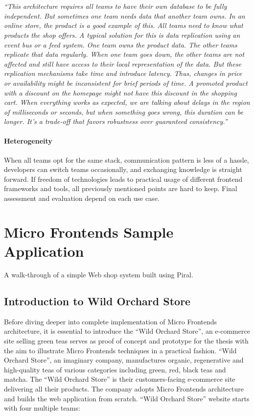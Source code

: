 \documentclass[a4paper]{book}
\begin{document}
\\ \\ 
\textit{
“This architecture requires all teams to have their own database to be fully independent. But sometimes one team needs data that another team owns. In an online store, the product is a good example of this. All teams need to know what products the shop offers. A typical solution for this is data replication using an event bus or a feed system. One team owns the product data. The other teams replicate that data regularly. When one team goes down, the other teams are not affected and still have access to their local representation of the data. But these replication mechanisms take time and introduce latency. Thus, changes in price or availability might be inconsistent for brief periods of time. A promoted product with a discount on the homepage might not have this discount in the shopping cart. When everything works as expected, we are talking about delays in the region of milliseconds or seconds, but when something goes wrong, this duration can be longer. It’s a trade-off that favors robustness over guaranteed consistency.”
}
\\ \\
\textbf{Heterogeneity}
\\ \\ 
When all teams opt for the same stack, communication pattern is less of a hassle, developers can switch teams occasionally, and exchanging knowledge is straight forward. If freedom of technologies leads to practical usage of different frontend frameworks and tools, all previously mentioned points are hard to keep. Final assessment and evaluation depend on each use case.

\chapter{Micro Frontends Sample Application}
A walk-through of a simple Web shop system built using Piral. 
\section{Introduction to Wild Orchard Store}

Before diving deeper into complete implementation of Micro Frontends architecture, it is essential to introduce the “Wild Orchard Store”, an e-commerce site selling green teas serves as proof of concept and prototype for the thesis with the aim to illustrate Micro Frontends techniques in a practical fashion. “Wild Orchard Store”, an imaginary company, manufactures organic, regenerative and high-quality teas of various categories including green, red, black teas and matcha. The “Wild Orchard Store” is their customers-facing e-commerce site delivering all their products. 
The company adopts Micro Frontends architecture and builds the web application from scratch. “Wild Orchard Store” website starts with four multiple teams:
\end{document}
